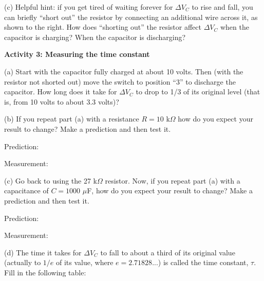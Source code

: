 (c)  Helpful hint: if you get tired of waiting forever for $\Delta V_C$ to rise and fall, you can briefly ``short out'' the resistor by connecting an additional wire across it, as shown to the right.  
How does ``shorting out'' the resistor affect $\Delta V_C$ when the capacitor is charging?  When the capacitor is discharging?
\answerspace{0.7in}

\pagebreak[2]
\textbf{Activity 3: Measuring the time constant}

(a) Start with the capacitor fully charged at about 10 volts.  Then (with the resistor not shorted out) move the switch to position “3” to discharge the capacitor.  How long does it take for $\Delta V_C$ to drop to 1/3 of its original level (that is, from 10 volts to about 3.3 volts)?
\vspace{0.8in}

(b) If you repeat part (a) with a resistance $R = 10$ k$\Omega$ how do you expect your result to change?  Make a prediction and then test it.

\vspace{0.2 in}
\hspace{0.4 in} Prediction:
\vspace{0.2 in}

\hspace{0.4 in} Measurement:  
\vspace{0.2 in}

(c) Go back to using the 27 k$\Omega$ resistor.  Now, if you repeat part (a) with a capacitance of $C=1000$ $\mu$F, how do you expect your result to change?  Make a prediction and then test it.

\vspace{0.2 in}
\hspace{0.4 in} Prediction:
\vspace{0.2 in}

\hspace{0.4 in} Measurement:  
\vspace{0.2 in}

(d) The time it takes for $\Delta V_C$ to fall to about a third of its original value (actually to $1/e$ of its value, where $e=2.71828...$) is called the time constant, $\tau$.   Fill in the following table:


